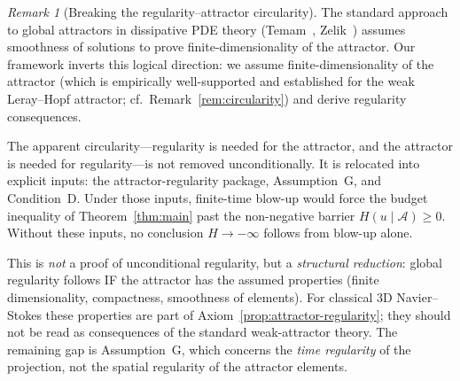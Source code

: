 \documentclass[12pt,a4paper]{article}
\theoremstyle{definition}
\theoremstyle{plain}
\theoremstyle{remark}
\newtheorem{remark}[definition]{Remark}
\begin{document}
\begin{remark}[Breaking the regularity--attractor circularity]
\label{rem:circularity-discussion}
The standard approach to global attractors in dissipative PDE theory
(Temam~\cite{Temam2001}, Zelik~\cite{Zelik2014}) assumes smoothness
of solutions to prove finite-dimensionality of the attractor.
Our framework inverts this logical direction: we assume
finite-dimensionality of the attractor (which is empirically
well-supported and established for the weak Leray--Hopf attractor;
cf.\ Remark~\ref{rem:circularity}) and derive regularity consequences.

The apparent circularity---regularity is needed for the attractor,
and the attractor is needed for regularity---is not removed
unconditionally.  It is relocated into explicit inputs: the
attractor-regularity package, Assumption~G, and Condition~D.  Under
those inputs, finite-time blow-up would force the budget inequality
of Theorem~\ref{thm:main} past the non-negative barrier
$H(u \mid \mathcal{A}) \ge 0$.  Without these inputs, no conclusion
$H\to-\infty$ follows from blow-up alone.

This is \emph{not} a proof of unconditional regularity, but a
\emph{structural reduction}: global regularity follows IF the
attractor has the assumed properties (finite dimensionality,
compactness, smoothness of elements).  For classical 3D
Navier--Stokes these properties are part of
Axiom~\ref{prop:attractor-regularity}; they should not be read as
consequences of the standard weak-attractor theory.
The remaining gap is Assumption~G, which concerns the
\emph{time regularity} of the projection, not the spatial regularity
of the attractor elements.
\end{remark}
\end{document}
